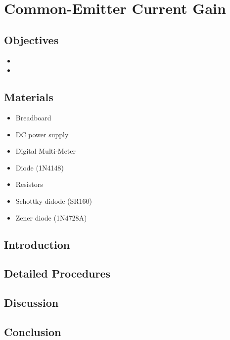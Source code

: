 \chapter{Common-Emitter Current Gain}


\section{Objectives}
\begin{itemize}
    \item 
    \item 
\end{itemize}

\section{Materials}
\begin{itemize}
    \item Breadboard
    \item DC power supply
    \item Digital Multi-Meter
    \item Diode (1N4148)
    \item Resistors
    \item Schottky didode (SR160)
    \item Zener diode (1N4728A)
\end{itemize}

\section{Introduction}


\section{Detailed Procedures}


\section{Discussion}


\section{Conclusion}
